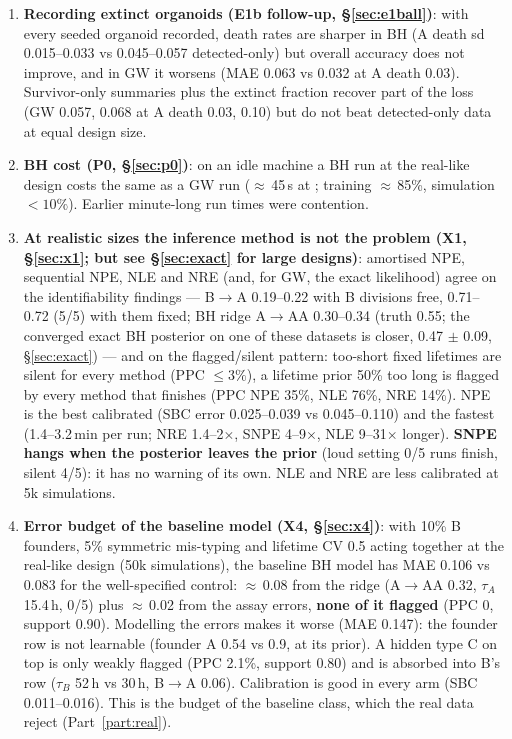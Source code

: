 \documentclass[10pt,a4paper]{article}
\newcommand{\tA}{$\tau_A$}
\newcommand{\tB}{$\tau_B$}
\newcommand{\code}[1]{\texttt{\detokenize{#1}}}
\begin{document}
\begin{enumerate}[leftmargin=1.4em]
\item \textbf{Recording extinct organoids (E1b follow-up, \S\ref{sec:e1ball})}: with every seeded organoid recorded, death rates are sharper in BH (A death sd 0.015--0.033 vs 0.045--0.057 detected-only) but overall accuracy does not improve, and in GW it worsens (MAE 0.063 vs 0.032 at A death 0.03). Survivor-only summaries plus the extinct fraction recover part of the loss (GW 0.057, 0.068 at A death 0.03, 0.10) but do not beat detected-only data at equal design size.
\item \textbf{BH cost (P0, \S\ref{sec:p0})}: on an idle machine a BH run at the real-like design costs the same as a GW run ($\approx$\,45\,s at \code{budget=dev}; training $\approx$\,85\%, simulation $<10\%$). Earlier minute-long run times were contention.
\item \textbf{At realistic sizes the inference method is not the problem (X1, \S\ref{sec:x1}; but see \S\ref{sec:exact} for large designs)}: amortised NPE, sequential NPE, NLE and NRE (and, for GW, the exact likelihood) agree on the identifiability findings --- B$\to$A 0.19--0.22 with B divisions free, 0.71--0.72 (5/5) with them fixed; BH ridge A$\to$AA 0.30--0.34 (truth 0.55; the converged exact BH posterior on one of these datasets is closer, 0.47 $\pm$ 0.09, \S\ref{sec:exact}) --- and on the flagged/silent pattern: too-short fixed lifetimes are silent for every method (PPC $\le 3\%$), a lifetime prior 50\% too long is flagged by every method that finishes (PPC NPE 35\%, NLE 76\%, NRE 14\%). NPE is the best calibrated (SBC error 0.025--0.039 vs 0.045--0.110) and the fastest (1.4--3.2\,min per run; NRE 1.4--2$\times$, SNPE 4--9$\times$, NLE 9--31$\times$ longer). \textbf{SNPE hangs when the posterior leaves the prior} (loud setting 0/5 runs finish, silent 4/5): it has no warning of its own. NLE and NRE are less calibrated at 5k simulations.
\item \textbf{Error budget of the baseline model (X4, \S\ref{sec:x4})}: with 10\% B founders, 5\% symmetric mis-typing and lifetime CV 0.5 acting together at the real-like design (50k simulations), the baseline BH model has MAE 0.106 vs 0.083 for the well-specified control: $\approx$\,0.08 from the ridge (A$\to$AA 0.32, \tA{} 15.4\,h, 0/5) plus $\approx$\,0.02 from the assay errors, \textbf{none of it flagged} (PPC 0, support 0.90). Modelling the errors makes it worse (MAE 0.147): the founder row is not learnable (founder A 0.54 vs 0.9, at its prior). A hidden type C on top is only weakly flagged (PPC 2.1\%, support 0.80) and is absorbed into B's row (\tB{} 52\,h vs 30\,h, B$\to$A 0.06). Calibration is good in every arm (SBC 0.011--0.016). This is the budget of the baseline class, which the real data reject (Part~\ref{part:real}).

\end{enumerate}
\end{document}
